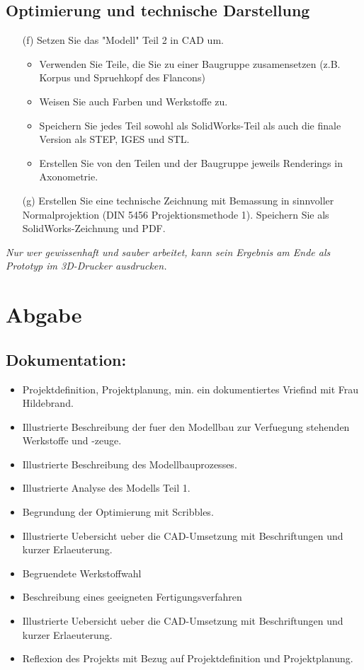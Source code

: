 \documentclass{report}
\begin{document}
\subsection{Optimierung und technische Darstellung}
\begin{enumerate}
  \item[(f)] Setzen Sie das "Modell" Teil 2 in CAD um.
    \begin{itemize}
      \item Verwenden Sie Teile, die Sie zu einer Baugruppe zusamensetzen (z.B.
        Korpus und Spruehkopf des Flancons)
      \item Weisen Sie auch Farben und Werkstoffe zu.
      \item Speichern Sie jedes Teil sowohl als SolidWorks-Teil als auch die
        finale Version als STEP, IGES und STL.
      \item Erstellen Sie von den Teilen und der Baugruppe jeweils Renderings in Axonometrie.
    \end{itemize}

  \item[(g)] Erstellen Sie eine technische Zeichnung mit Bemassung in sinnvoller
    Normalprojektion (DIN 5456 Projektionsmethode 1). Speichern Sie als
    SolidWorks-Zeichnung und PDF.
\end{enumerate}

\textit{Nur wer gewissenhaft und sauber arbeitet, kann sein Ergebnis am Ende
als Prototyp im 3D-Drucker ausdrucken.}

\section{Abgabe}
\subsection{Dokumentation:}
\begin{itemize}
  \item Projektdefinition, Projektplanung, min. ein dokumentiertes Vriefind mit Frau Hildebrand.
  \item Illustrierte Beschreibung der fuer den Modellbau zur Verfuegung stehenden Werkstoffe und -zeuge.
  \item Illustrierte Beschreibung des Modellbauprozesses.
    \vspace{20pt}
  \item Illustrierte Analyse des Modells Teil 1.
  \item Begrundung der Optimierung mit Scribbles.
    \vspace{20pt}
  \item Illustrierte Uebersicht ueber die CAD-Umsetzung mit Beschriftungen und kurzer Erlaeuterung.
  \item Begruendete Werkstoffwahl
  \item Beschreibung eines geeigneten Fertigungsverfahren
  \item Illustrierte Uebersicht ueber die CAD-Umsetzung mit Beschriftungen und kurzer Erlaeuterung.
    \vspace{20pt}
  \item Reflexion des Projekts mit Bezug auf Projektdefinition und Projektplanung.
\end{itemize}
\end{document}
